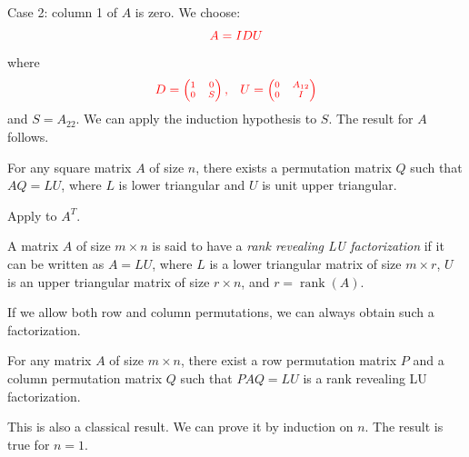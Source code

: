 \documentclass[10pt,twoside]{siamart1116}
\DeclareMathOperator{\rk}{rank}
\newcommand{\by}{\times}
\numberwithin{theorem}{section}
\providecommand{\DIFdel}[1]{{\protect\color{red} \scriptsize #1}} %
\begin{document}
\DIFdel{Case 2: column 1 of $A$ is zero. We choose:
	}\[
		\DIFdel{A = I D U
	}\]%
\DIFdel{where
	}\[
		\DIFdel{D = \begin{pmatrix}
			1 & 0 \\
			0 & S
		\end{pmatrix}, \quad
		U = \begin{pmatrix}
			0 & A_{12} \\
			0 & I
		\end{pmatrix}
	}\]%
\DIFdel{and $S=A_{22}$. We can apply the induction hypothesis to $S$. The result for $A$ follows.
}%

\DIFdel{For any square matrix $A$ of size $n$, there exists a permutation matrix $Q$ such that $AQ = LU$, where $L$ is lower triangular and $U$ is unit upper triangular.
}%

\DIFdel{Apply }%
\DIFdel{to $A^T$.
}%

\DIFdel{A matrix $A$ of size $m \by n$ is said to have a \emph{rank revealing LU factorization} if it can be written as $A = LU$, where $L$ is a lower triangular matrix of size $m \by r$, $U$ is an upper triangular matrix of size $r \by n$, and $r = \rk(A)$.
}%

\DIFdel{If we allow both row and column permutations, we can always obtain such a factorization.
}%

\DIFdel{For any matrix $A$ of size $m \by n$, there exist a row permutation matrix $P$ and a column permutation matrix $Q$ such that $PAQ = LU$ is a rank revealing LU factorization.
}%

\DIFdel{This is also a classical result. We can prove it by induction on $n$. The result is true for $n=1$.
}%
\end{document}
